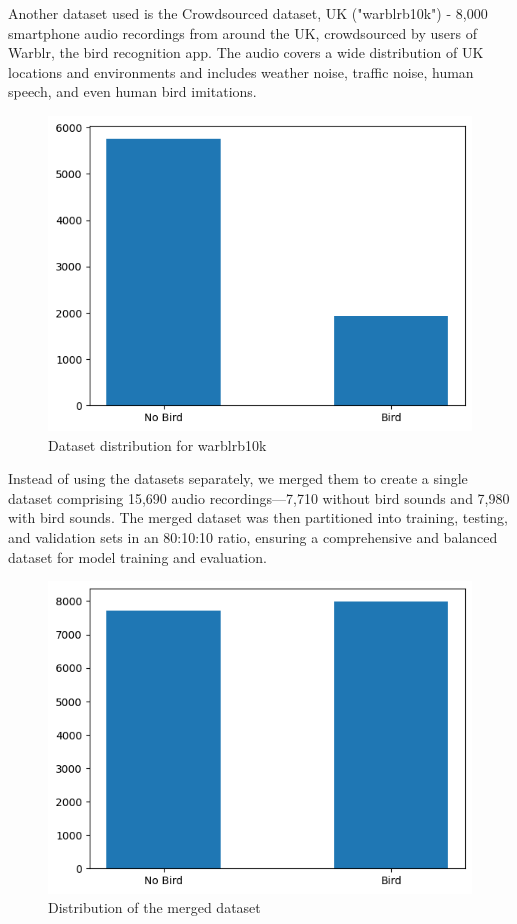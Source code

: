       Another dataset used is the Crowdsourced dataset, UK ("warblrb10k") - 8,000 smartphone audio recordings from around the UK, crowdsourced by users of Warblr, the bird recognition app. The audio covers a wide distribution of UK locations and environments and includes weather noise, traffic noise, human speech, and even human bird imitations.
      \begin{figure}[h!]
            \centering
            \includegraphics[scale=0.75]{images/dataset_detection-2.png}
            \caption{Dataset distribution for warblrb10k}
            \label{fig:warblrb10k dataset}
      \end{figure}
      \newpage
      Instead of using the datasets separately, we merged them to create a single dataset comprising 15,690 audio recordings—7,710 without bird sounds and 7,980 with bird sounds. The merged dataset was then partitioned into training, testing, and validation sets in an 80:10:10 ratio, ensuring a comprehensive and balanced dataset for model training and evaluation.
      \begin{figure}[h!]
            \centering
            \includegraphics[scale=0.75]{images/dataset_detection-3.png}
            \caption{Distribution of the merged dataset}
            \label{fig:merged_dataset}
      \end{figure}         \newpage      

